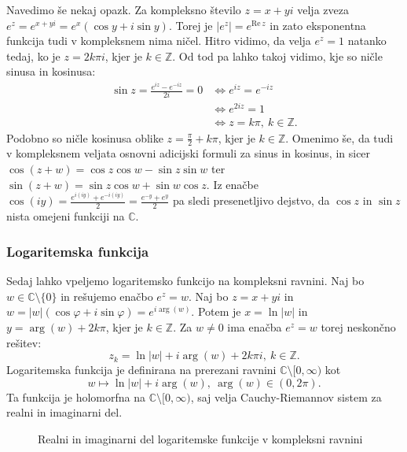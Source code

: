 \documentclass[10pt, a4paper]{article}
\newcommand{\Z}{\mathbb {Z}}
\newcommand{\C}{\mathbb {C}}
\begin{document}
Navedimo še nekaj opazk. Za kompleksno število $z = x + yi$ 
velja zveza $e^z = e^{x + yi} = e^x (\cos y + i \sin y)$.
Torej je $|e^z| = e^{\mathrm{Re}\, z}$ in zato 
eksponentna funkcija tudi v kompleksnem nima ničel.
Hitro vidimo, da velja $e^z = 1$ natanko tedaj, ko je 
$z = 2 k \pi i$, kjer je $k \in \Z$.
Od tod pa lahko takoj vidimo, kje so ničle sinusa in kosinusa:
\begin{align*}
  \sin z = \frac{e^{iz} - e^{-iz}}{2i} = 0 &\Leftrightarrow e^{iz} = e^{-iz}\\
  &\Leftrightarrow e^{2 iz} = 1\\
  &\Leftrightarrow z = k\pi, \ k \in \Z.
\end{align*}
Podobno so ničle kosinusa oblike $z = \frac{\pi}{2} + k\pi$, kjer je $k \in \Z$.
Omenimo še, da tudi v kompleksnem veljata osnovni adicijski formuli za sinus in kosinus, in sicer 
$\cos (z + w) = \cos z \cos w - \sin z \sin w$ ter $\sin (z + w) = \sin z \cos w + \sin w \cos z$.
Iz enačbe $\cos (iy) = \frac{e^{i(iy)} + e^{-i(iy)}}{2} = \frac{e^{-y} + e^y}{2}$
pa sledi presenetljivo dejstvo, da $\cos z$ in $\sin z$ nista omejeni funkciji na $\C$.

\subsubsection{Logaritemska funkcija}

Sedaj lahko vpeljemo logaritemsko funkcijo na kompleksni ravnini.
Naj bo $w \in \C \setminus \{0\}$ in rešujemo enačbo $e^z = w$.
Naj bo $z = x + yi$ in $w = |w| (\cos \varphi + i \sin \varphi) = e^{i \arg (w)}$.
Potem je $x = \ln |w|$ in $y = \arg (w) + 2 k \pi$, kjer je $k \in \Z$.
Za $w \neq 0$ ima enačba $e^z = w$ torej neskončno rešitev:
$$z_k = \ln |w| + i \arg(w) + 2k\pi i,\ k \in \Z.$$
Logaritemska funkcija je definirana na prerezani ravnini $\C \setminus [0, \infty)$ kot 
$$w \mapsto \ln |w| + i \arg (w),\ \arg(w) \in (0, 2 \pi).$$
Ta funkcija je holomorfna na $\C \setminus [0, \infty)$, saj velja Cauchy-Riemannov sistem za realni in imaginarni del.

\begin{figure}[h!]%
  \centering
  \qquad
  \caption{Realni in imaginarni del logaritemske funkcije v kompleksni ravnini}%
\end{figure}
\end{document}
